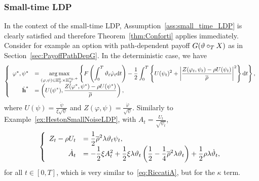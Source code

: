\subsubsection{Small-time LDP}
In the context of the small-time LDP,  Assumption~\ref{ass:small_time_LDP} is clearly satisfied and therefore Theorem~\ref{thm:Conforti} applies immediately.
Consider for example an option with path-dependent payoff $G(\vartheta\circ_{T} X)$ 
as in Section~\ref{sec:PayoffPathDepG}.
In the deterministic case, we have
\begin{equation*}
\left\{
\begin{array}{rl}
\varphi^{*},\psi^{*}
& = \displaystyle \operatorname*{arg\,max}\limits_{(\varphi,\psi) \in \mathbb{H}_T^0\times \mathbb{H}_T^{v_0,+}} \left\{F\left(\int_0^T\vartheta_t \dot{\varphi}_t \mathrm{d} t\right) - \frac{1}{2}\int_0^T \left\{U(\psi_t)^2 + \left|\frac{Z(\varphi_t,\psi_t) - \rho U(\psi_t)}{\overline{\rho}}\right|^2\right\}\mathrm{d} t\right\},\\
\dot{\boldsymbol{\mathrm{h}}}^{*} & = \displaystyle 
\left(U(\psi^{*}),  \frac{Z(\varphi^{*},\psi^{*}) - \rho U(\psi^{*})}{\overline{\rho}}\right),
\end{array}
\right.
\end{equation*}
where
$U(\psi) = \frac{\dot{\psi}}{\xi \sqrt{\psi}}$
and
$Z(\varphi,\psi) = \frac{\dot{\varphi}}{\sqrt{\psi}}$.
Similarly to Example~\ref{ex:HestonSmallNoiseLDP}, 
with $A_t = \frac{U_t}{\sqrt{\psi_t}}$,
\begin{equation*}
\left\{
\begin{array}{rl}
\displaystyle Z_t - \rho U_t &= \displaystyle \frac{1}{2} \overline{\rho}^2 \lambda \vartheta_t \psi_t,\\
\displaystyle \dot{A}_t
&= \displaystyle -\frac{1}{2}\xi A_t^2 + \frac{1}{2}\xi \lambda \vartheta_t \left(\frac{1}{2} - \frac{1}{4}\overline{\rho}^2\lambda\vartheta_t \right) + \frac{1}{2}\rho\lambda\dot{\vartheta}_t,
\end{array}
\right.
\end{equation*}
for all $t\in[0,T]$,
which is very similar to~\eqref{eq:RiccatiA}, 
but for the $\kappa$ term.
